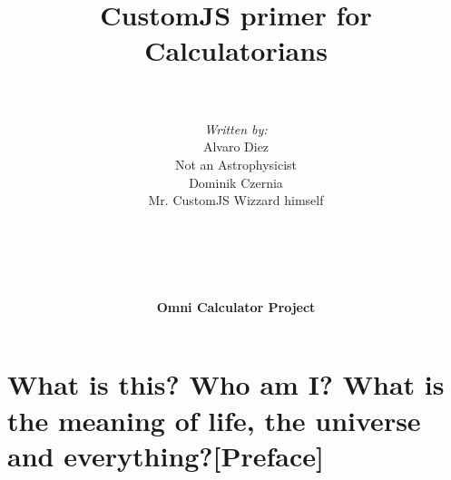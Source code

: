 \documentclass[11pt,a4paper,oldfontcommands]{memoir}
\begin{document}
%
%
\thispagestyle{empty}

{%

\centering
\title{ \normalsize \textsc{}\\ [2.0cm]
		\hline \vspace{10pt} \\
		\huge \textbf{CustomJS primer for Calculatorians\textsuperscript{\textregistered}} \vspace{5pt}
		\textbf{\hline}{\hline} \\ [0.5cm]
		\large \vspace{200pt}\\}		}
		


\author{{\textit{Written by:}}\\
        \LARGE Alvaro Diez \\
		Not an Astrophysicist\texttrademark \\ 
		\LARGE Dominik Czernia \\
		Mr. CustomJS Wizzard himself \\ \\
	\\ \\ \\ \\
		\LARGE {\textbf{Omni Calculator Project}} \vspace{-50pt}
} 

\maketitle
\noalign
\clearpage

\tableofcontents

\clearpage


\chapter{What is this? Who am I? What is the meaning of life, the universe and everything?[Preface]}
\end{document}
